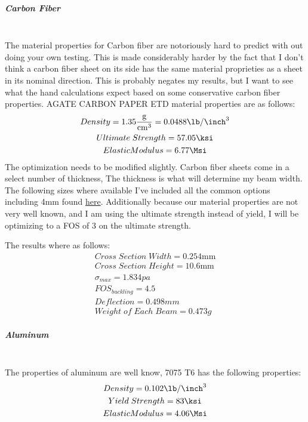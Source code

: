 \documentclass[12pt,letterpaper]{article}
\begin{document}
\subparagraph{Carbon Fiber}
\mbox{}\\


The material properties for Carbon fiber are notoriously hard to predict with out doing your own testing. This is made considerably harder by the fact that I don't think a carbon fiber sheet on its side has the same material proprieties as a sheet in its nominal direction. This is probably negates my results, but I want to see what the hand calculations expect based on some conservative carbon fiber properties. AGATE CARBON PAPER ETD material properties are as follows:
\begin{gather*}
Density = 1.35\unit[per-mode = fraction]{\g\per\cm\tothe{3}} = 0.0488\unit[per-mode = fraction]{\lb\per\inch\tothe{3}}\\
Ultimate\;Strength = 57.05\unit{\ksi}\\
Elastic Modulus = 6.77\unit{\Msi}
\end{gather*}
The optimization needs to be modified slightly. Carbon fiber sheets come in a select number of thickness, The thickness is what will determine my beam width. The following sizes where available I've included all the common options including 4mm found \href{https://protechcomposites.com/resources/standard-thicknesses}{here}. Additionally because our material properties are not very well known, and I am using the ultimate strength instead of yield, I will be optimizing to a FOS of 3 on the ultimate strength.

The results where as follows:
\begin{gather*}
Cross\;Section\;Width = 0.254\unit{\mm}\\
Cross\;Section\;Height = 10.6\unit{\mm}\\
\sigma_{max} = 1.834\unit{pa}\\
FOS_{buckling} = 4.5\\
Deflection = 0.498\unit{mm}\\
Weight\;of\;Each\;Beam = 0.473\unit{g}
\end{gather*}
\subparagraph{Aluminum}
\mbox{}\\


The properties of aluminum are well know, 7075 T6 has the following properties:
\begin{gather*}
Density = 0.102\unit[per-mode = fraction]{\lb\per\inch\tothe{3}}\\
Yield\;Strength = 83\unit{\ksi}\\
Elastic Modulus = 4.06\unit{\Msi}
\end{gather*}
\end{document}
